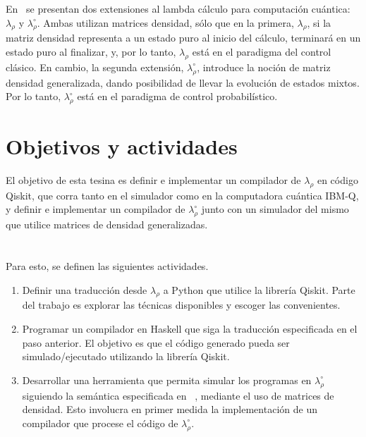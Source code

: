 \documentclass[a4paper]{article}
\begin{document}
En~\cite{DiazcaroAPLAS17} se presentan dos extensiones al lambda cálculo para
computación cuántica: $\lambda_\rho$ y $\lambda_\rho^\circ$. Ambas utilizan
matrices densidad, sólo que en la primera, $\lambda_\rho$, si la matriz densidad representa a un
estado puro al inicio del cálculo, terminará en un estado puro al finalizar, y,
por lo tanto, $\lambda_\rho$ está en el paradigma del control clásico. En
cambio, la segunda extensión, $\lambda_\rho^\circ$, introduce la noción de
matriz densidad generalizada, dando posibilidad de llevar la evolución de
estados mixtos. Por lo tanto, $\lambda_\rho^\circ$ está en el paradigma de
control probabilístico.


\section*{Objetivos y actividades}
El objetivo de esta tesina es definir e implementar un compilador de
$\lambda_\rho$ en código Qiskit, que corra tanto en el simulador como en la
computadora cuántica IBM-Q, y definir e implementar un compilador de
$\lambda_\rho^\circ$ junto con un simulador del mismo que utilice matrices de densidad generalizadas.
\\
\\
\\
\newline
\newline
\newline
\newline
\newline
\newline
Para esto, se definen las siguientes actividades.
\begin{enumerate}
\item\label{it:trad} Definir una traducción desde $\lambda_\rho$ a
  Python que utilice la librería Qiskit. Parte del trabajo es explorar las técnicas disponibles y escoger las convenientes.
\item\label{it:lamrho} Programar un compilador en Haskell que siga la traducción especificada en el paso anterior. El objetivo es que el código generado pueda ser simulado/ejecutado utilizando la librería Qiskit.
\item\label{it:lamrhoc} Desarrollar una herramienta que permita simular los programas en $\lambda_\rho^\circ$ siguiendo la semántica especificada en ~\cite{DiazcaroAPLAS17}, mediante el uso de matrices de densidad. Esto involucra en primer medida la implementación de un compilador que procese el código de $\lambda_\rho^\circ$.
\end{enumerate}
\end{document}
